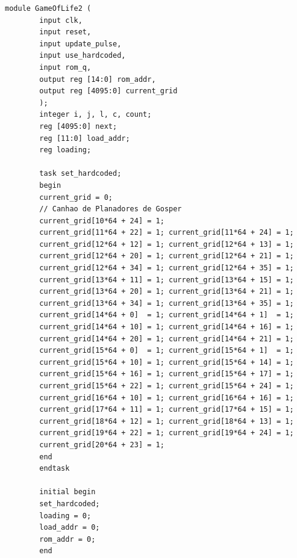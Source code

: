 \documentclass[12pt, a4paper]{article}
\begin{document}
	\begin{lstlisting}[style=verilog, caption={\texttt{GameOfLife2.v} --- Núcleo do autômato celular com suporte a reset, carregamento de ROM e atualização paralela da grade 64$\times$64.}, label={lst:gameoflife}]
		module GameOfLife2 (
		input clk,
		input reset,
		input update_pulse,
		input use_hardcoded,
		input rom_q,
		output reg [14:0] rom_addr,
		output reg [4095:0] current_grid
		);
		integer i, j, l, c, count;
		reg [4095:0] next;
		reg [11:0] load_addr;
		reg loading;
		
		task set_hardcoded;
		begin
		current_grid = 0;
		// Canhao de Planadores de Gosper
		current_grid[10*64 + 24] = 1;
		current_grid[11*64 + 22] = 1; current_grid[11*64 + 24] = 1;
		current_grid[12*64 + 12] = 1; current_grid[12*64 + 13] = 1;
		current_grid[12*64 + 20] = 1; current_grid[12*64 + 21] = 1;
		current_grid[12*64 + 34] = 1; current_grid[12*64 + 35] = 1;
		current_grid[13*64 + 11] = 1; current_grid[13*64 + 15] = 1;
		current_grid[13*64 + 20] = 1; current_grid[13*64 + 21] = 1;
		current_grid[13*64 + 34] = 1; current_grid[13*64 + 35] = 1;
		current_grid[14*64 + 0]  = 1; current_grid[14*64 + 1]  = 1;
		current_grid[14*64 + 10] = 1; current_grid[14*64 + 16] = 1;
		current_grid[14*64 + 20] = 1; current_grid[14*64 + 21] = 1;
		current_grid[15*64 + 0]  = 1; current_grid[15*64 + 1]  = 1;
		current_grid[15*64 + 10] = 1; current_grid[15*64 + 14] = 1;
		current_grid[15*64 + 16] = 1; current_grid[15*64 + 17] = 1;
		current_grid[15*64 + 22] = 1; current_grid[15*64 + 24] = 1;
		current_grid[16*64 + 10] = 1; current_grid[16*64 + 16] = 1;
		current_grid[17*64 + 11] = 1; current_grid[17*64 + 15] = 1;
		current_grid[18*64 + 12] = 1; current_grid[18*64 + 13] = 1;
		current_grid[19*64 + 22] = 1; current_grid[19*64 + 24] = 1;
		current_grid[20*64 + 23] = 1;
		end
		endtask
		
		initial begin
		set_hardcoded;
		loading = 0;
		load_addr = 0;
		rom_addr = 0;
		end
		

\end{lstlisting}
\end{document}
